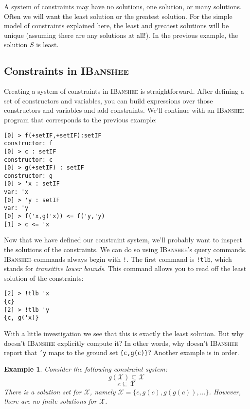 \documentclass[10pt]{article}
\newcommand{\ibanshee}{\textsc{IBanshee}}
\newcommand{\var}[1]{\mathcal{#1}}
\newtheorem{example}{Example}
\begin{document}
A system of constraints may have no solutions, one solution, or many
solutions. Often we will want the least solution or the greatest
solution. For the simple model of constraints explained here, the
least and greatest solutions will be unique (assuming there are any
solutions at all!). In the previous example, the solution $S$ is
least.

\subsection{Constraints in \ibanshee{}}

Creating a system of constraints in \ibanshee{} is
straightforward. After defining a set of constructors and variables,
you can build expressions over those constructors and variables and
add constraints. We'll continue with an \ibanshee{} program that
corresponds to the previous example:

\begin{verbatim}
[0] > f(+setIF,+setIF):setIF
constructor: f
[0] > c : setIF
constructor: c
[0] > g(+setIF) : setIF
constructor: g
[0] > 'x : setIF
var: 'x
[0] > 'y : setIF
var: 'y
[0] > f('x,g('x)) <= f('y,'y)
[1] > c <= 'x
\end{verbatim}

Now that we have defined our constraint system, we'll probably want to
inspect the solutions of the constraints. We can do so using
\ibanshee{}'s query commands. \ibanshee{} commands always begin with
\texttt{!}. The first command is \texttt{!tlb}, which stands for
\emph{transitive lower bounds}. This command allows you to read off
the least solution of the constraints:

\begin{verbatim}
[2] > !tlb 'x
{c}
[2] > !tlb 'y
{c, g('x)}
\end{verbatim}

With a little investigation we see that this is exactly the least
solution. But why doesn't \ibanshee{} explicitly compute it? In other
words, why doesn't \ibanshee{} report that \texttt{'y} maps to the
ground set \texttt{\{c,g(c)\}}? Another example is in order. 

\begin{example}
Consider the following constraint system: 
\[
g(\var{X}) \subseteq \var{X}
\]
\[
c \subseteq \var{X}
\]
There is a solution set for $\var{X}$, namely $\var{X} = \{c, g(c),
g(g(c)),\ldots\}$. However, there are no finite solutions for
$\var{X}$.
\end{example}
\end{document}
